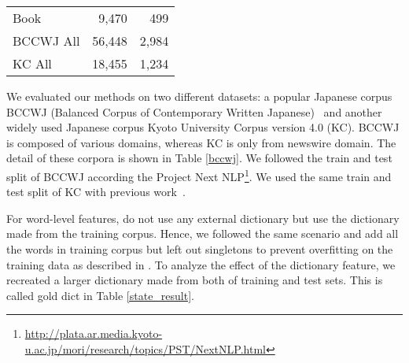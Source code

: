 \documentclass[11pt,letterpaper]{article}
\begin{document}
\begin{table}[t]
\begin{center}
\begin{tabular}{p{45mm} rr}
    Book& 9,470&499 \\
    BCCWJ All  &56,448 &2,984 \\  \hline
    KC All &18,455 & 1,234  \\                                                                                                                                                                                                                                                                                                                                                                   
    \bottomrule                                                                                                                                               
    \end{tabular}                                                                                                                                                                                                                                                                                                           
    \end{center}                                                                                                                                                                                                                                                                                                            
 \end{table}  

We evaluated our methods on two different datasets: a popular Japanese corpus BCCWJ (Balanced Corpus of Contemporary Written Japanese)~\cite{maekawa2014balanced} and another widely used Japanese corpus Kyoto University Corpus version 4.0 (KC). 
BCCWJ is composed of various domains, whereas KC is only from newswire domain. The detail of these corpora is shown in Table \ref{bccwj}.  
We followed the train and test split of BCCWJ according the Project Next NLP\footnote{\url{http://plata.ar.media.kyoto-u.ac.jp/mori/research/topics/PST/NextNLP.html}}. 
We used the same train and test split of KC with previous work~\cite{kudo-yamamoto-matsumoto:2004:EMNLP,uchimoto2001unknown}.

For word-level features,
{} do not use any external dictionary but use the dictionary made from the training corpus. Hence, we followed the same scenario and add all the words in training corpus but left out singletons to prevent overfitting on the training data as described in \cite{neubig-nakata-mori:2011:ACL-HLT2011}.
To analyze the effect of the dictionary feature, we recreated a larger dictionary made from both of training and test sets. This is called gold dict in Table \ref{state_result}.
\end{document}
